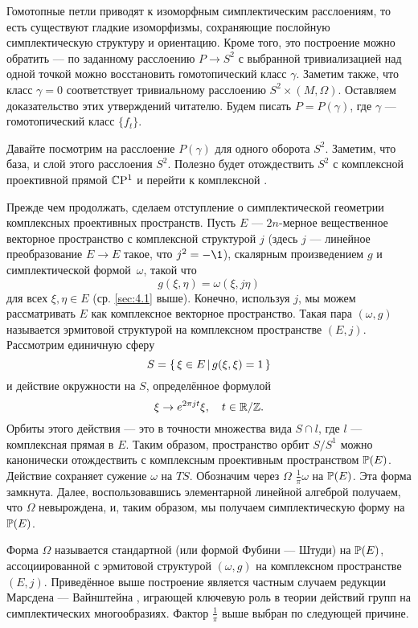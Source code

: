 Гомотопные петли приводят к изоморфным симплектическим расслоениям, то
есть существуют гладкие изоморфизмы, сохраняющие послойную
симплектическую структуру и ориентацию.
Кроме того, это построение можно обратить --- по заданному расслоению
$P \to S^2$ с выбранной тривиализацией над одной точкой можно
восстановить гомотопический класс $\gamma$.
Заметим также, что класс $\gamma = 0$ соответствует тривиальному
расслоению $S^2 \times (M, \Omega)$.
Оставляем доказательство этих утверждений читателю.
Будем писать $P = P(\gamma)$, где $\gamma$ --- гомотопический класс
$\{f_t\}$.

Давайте посмотрим на расслоение $P(\gamma)$ для одного оборота $S^2$.
Заметим, что база, и слой этого расслоения $S^2$.
Полезно будет отождествить $S^2$ с комплексной проективной прямой
$\mathbb{C}\mathrm{P}^1$ и перейти к комплексной .

Прежде чем продолжать, сделаем отступление о симплектической геометрии
комплексных проективных пространств. 
Пусть $E$ --- $2n$-мерное вещественное векторное пространство с
комплексной структурой $j$ 
(здесь $j$ --- линейное преобразование $E\to E$ такое, что $j^2 = -\1$),
скалярным произведением $g$ и симплектической формой~$\omega$, такой что
\[g(\xi, \eta ) = \omega(\xi, j\eta)\]
для всех $\xi, \eta \in E$ (ср. \ref{sec:4.1} выше).
Конечно, используя $j$, мы можем рассматривать $E$ как комплексное
векторное пространство. 
Такая пара $(\omega, g)$ называется эрмитовой структурой на
комплексном пространстве $(E, j)$.
Рассмотрим единичную сферу
\[S = \left\{ \,{\xi \in E}\, \middle| \,{g(\xi, \xi) = 1}\, \right\}\]
и действие окружности на $S$, определённое формулой 
\[\xi \to e^{2\pi jt} \xi,\quad t \in \mathbb{R}/\mathbb{Z}.\]
Орбиты этого действия --- это в точности множества вида $S \cap l$,
где $l$ --- комплексная прямая в $E$. 
Таким образом, пространство орбит $S/S^1$ можно канонически
отождествить с комплексным проективным пространством $\mathbb{P}(E)$.
Действие сохраняет сужение $\omega$ на $T S$.
Обозначим через $\Omega$
 $\tfrac1\pi \omega$ на $\mathbb{P}(E)$.
Эта форма замкнута.
Далее, воспользовавшись элементарной линейной алгеброй получаем, что
$\Omega$ невырождена, и, таким образом, мы получаем симплектическую
форму на $\mathbb{P}(E)$. 

Форма $\Omega$ называется стандартной (или формой Фубини --- Штуди) на
$\mathbb{P}(E)$, ассоциированной с эрмитовой структурой $(\omega, g)$ на
комплексном пространстве $(E, j)$.
Приведённое выше построение является частным случаем редукции Марсдена
--- Вайнштейна \cite{MS}, играющей ключевую роль в теории действий
групп на симплектических многообразиях.
Фактор $\tfrac1\pi$ выше выбран по следующей причине.

